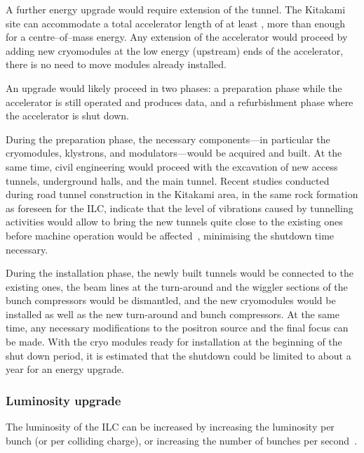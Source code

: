 A further energy upgrade would require extension of the tunnel.
The Kitakami site can accommodate a total accelerator length of at least , more than enough for a  centre--of--mass energy.
Any extension of the accelerator would proceed by adding new cryomodules at the low energy (upstream) ends of the accelerator, there is no need to move modules already installed. 

An upgrade would likely proceed in two phases: a preparation phase while the accelerator is still operated and produces data, and a refurbishment phase where the accelerator is shut down.

During the preparation phase, the necessary components---in particular the cryomodules, klystrons, and modulators---would be acquired and built.
At the same time, civil engineering would proceed with the excavation of new access tunnels, underground halls, and the main tunnel.
Recent studies conducted during road tunnel construction in the Kitakami area, in the same rock formation as foreseen for the ILC, indicate that the level of vibrations caused by tunnelling activities would allow to bring the new tunnels quite close to the existing ones before machine operation would be affected~\cite{bib:sanuki:lcws2018}, minimising the shutdown time necessary.

During the installation phase, the newly built tunnels would be connected to the existing ones, the beam lines at the turn-around and the wiggler sections of the bunch compressors would be dismantled, and the new cryomodules would be installed as well as the new turn-around and bunch compressors. 
At the same time, any necessary modifications to the positron source and the final focus can be made.
With the cryo modules ready for installation at the beginning of the shut down period, it is estimated that the shutdown could be limited to about a year for an energy upgrade.


\subsubsection{Luminosity upgrade}
\label{subsubsec:upg-optL}

The luminosity of the ILC can be increased by increasing the luminosity per bunch (or per colliding charge), or increasing the number of bunches per second~\cite{Harrison:2013nva}.

